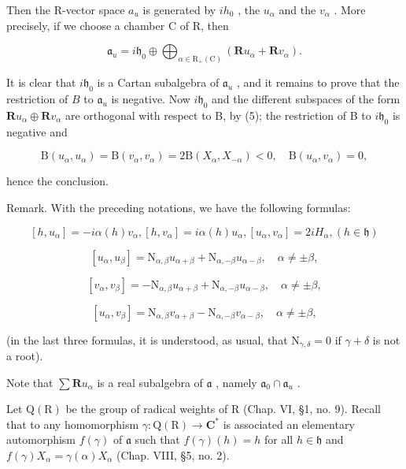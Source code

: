 Then the R-vector space \(a_{u}\) is generated by \(ih_{0}\) , the \(u_{\alpha}\) and the \(v_{\alpha}\) . More precisely, if we choose a chamber C of R, then

\[
\mathfrak {a} _ {u} = i \mathfrak {h} _ {0} \oplus \bigoplus_ {\alpha \in \mathrm{R} _ {+} (\mathrm{C})} \left(\mathbf {R} u _ {\alpha} + \mathbf {R} v _ {\alpha}\right).\tag{7}
\]

It is clear that \(i\mathfrak{h}_0\) is a Cartan subalgebra of \(\mathfrak{a}_u\) , and it remains to prove that the restriction of \(B\) to \(\mathfrak{a}_u\) is negative. Now \(i\mathfrak{h}_0\) and the different subspaces of the form \(\mathbf{R}u_{\alpha}\oplus \mathbf{R}v_{\alpha}\) are orthogonal with respect to B, by (5); the restriction of B to \(i\mathfrak{h}_0\) is negative and

\[
\mathrm{B} (u _ {\alpha}, u _ {\alpha}) = \mathrm{B} (v _ {\alpha}, v _ {\alpha}) = 2 \mathrm{B} (X _ {\alpha}, X _ {- \alpha}) <   0, \quad \mathrm{B} (u _ {\alpha}, v _ {\alpha}) = 0,\tag{8}
\]

hence the conclusion.

Remark. With the preceding notations, we have the following formulas:

\[
[ h, u _ {\alpha} ] = - i \alpha (h) v _ {\alpha}, [ h, v _ {\alpha} ] = i \alpha (h) u _ {\alpha}, [ u _ {\alpha}, v _ {\alpha} ] = 2 i H _ {\alpha}, (h \in \mathfrak {h})\tag{9}
\]

\[
[ u _ {\alpha}, u _ {\beta} ] = \mathrm{N} _ {\alpha , \beta} u _ {\alpha + \beta} + \mathrm{N} _ {\alpha , - \beta} u _ {\alpha - \beta}, \quad \alpha \neq \pm \beta ,\tag{10}
\]

\[
[ v _ {\alpha}, v _ {\beta} ] = - \mathrm{N} _ {\alpha , \beta} u _ {\alpha + \beta} + \mathrm{N} _ {\alpha , - \beta} u _ {\alpha - \beta}, \quad \alpha \neq \pm \beta ,\tag{11}
\]

\[
[ u _ {\alpha}, v _ {\beta} ] = \mathrm{N} _ {\alpha , \beta} v _ {\alpha + \beta} - \mathrm{N} _ {\alpha , - \beta} v _ {\alpha - \beta}, \quad \alpha \neq \pm \beta ,\tag{12}
\]

(in the last three formulas, it is understood, as usual, that \(\mathrm{N}_{\gamma, \delta} = 0\) if \(\gamma + \delta\) is not a root).

Note that \(\sum \mathbf{R}u_{\alpha}\) is a real subalgebra of \(\mathfrak{a}\) , namely \(\mathfrak{a}_0 \cap \mathfrak{a}_u\) .

Let \(\mathrm{Q}(\mathrm{R})\) be the group of radical weights of R (Chap. VI, §1, no. 9). Recall that to any homomorphism \(\gamma : \mathrm{Q}(\mathrm{R}) \to \mathbf{C}^*\) is associated an elementary automorphism \(f(\gamma)\) of \(\mathfrak{a}\) such that \(f(\gamma)(h) = h\) for all \(h \in \mathfrak{h}\) and \(f(\gamma)X_{\alpha} = \gamma(\alpha)X_{\alpha}\) (Chap. VIII, §5, no. 2).

